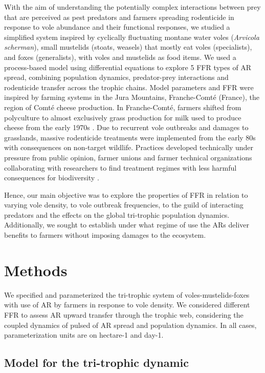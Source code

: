 \documentclass[11pt]{article}
\begin{document}
With the aim of understanding the potentially complex interactions between prey that are perceived as pest predators and farmers spreading rodenticide in response to vole abundance and their functional responses, we studied a simplified system inspired by cyclically fluctuating montane water voles (\textit{Arvicola scherman}), small mustelids (stoats, weasels) that mostly eat voles (specialists), and foxes (generalists), with voles and mustelids as food items. We used a process-based model using differential equations to explore 5 FFR types of AR spread, combining population dynamics, predator-prey interactions and rodenticide transfer across the trophic chains. Model parameters and FFR were inspired by farming systems in the Jura Mountains, Franche-Comté (France), the region of Comté cheese production. In Franche-Comté, farmers shifted from polyculture to almost exclusively grass production for milk used to produce cheese from the early 1970s \citep{Giraudoux1997}. Due to recurrent vole outbreaks and damages to grasslands, massive rodenticide treatments were implemented from the early 80s with consequences on non-target wildlife. Practices developed technically under pressure from public opinion, farmer unions and farmer technical organizations collaborating with researchers to find treatment regimes with less harmful consequences for biodiversity \citep{Delattre2009}. 

Hence, our main objective was to explore the properties of FFR in relation to varying vole density, to vole outbreak frequencies, to the guild of interacting predators and the effects on the global tri-trophic population dynamics. Additionally, we sought to establish under what regime of use the ARs deliver benefits to farmers without imposing damages to the ecosystem. 

\section{Methods}

We specified and parameterized the tri-trophic system of voles-mustelids-foxes with use of AR by farmers in response to vole density. We considered different FFR to assess AR upward transfer through the trophic web, considering the coupled dynamics of pulsed of AR spread and population dynamics. In all cases, parameterization units are on hectare-1 and day-1.

\subsection{Model for the tri-trophic dynamic}
\end{document}
